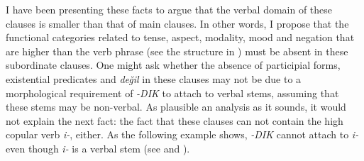 \documentclass[output=paper]{langsci/langscibook}
\begin{document}
I have been presenting these facts to argue that the verbal domain of these clauses is smaller than that of main clauses. 
In other words, I propose that the functional categories related to tense, aspect, modality, mood and negation 
that are higher than the verb phrase (see the structure in ) must be absent in these subordinate clauses. 
One might ask whether the absence of participial forms, existential predicates and \textit{değil} in these clauses 
may not be due to a morphological requirement of \textit{-DIK} to attach to verbal stems, assuming that these stems may be non-verbal. 
As plausible an analysis as it sounds, it would not explain the next fact: 
the fact that these clauses can not contain the high copular verb \textit{i-}, either. 
As the following example shows, \textit{-DIK} cannot attach to \textit{i-} even though \textit{i-} is a verbal stem 
(see  and ).

\z
\end{document}
